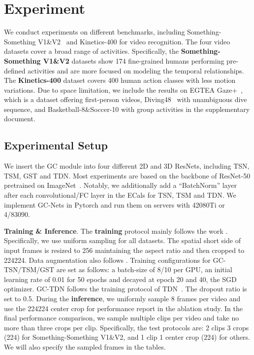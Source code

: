 \vspace{-0.2cm}
\section{Experiment}
\vspace{-0.2cm}
We conduct experiments on different benchmarks, including Something-Something V1\&V2~\cite{goyal2017something,mahdisoltani2018effectiveness} and Kinetics-400 \cite{kay2017kinetics} for video recognition. The four video datasets cover a broad range of activities. Specifically, the \textbf{Something-Something V1\&V2} datasets show 174 fine-grained humans performing pre-defined activities and are more focused on modeling the temporal relationships. The \textbf{Kinetics-400} dataset covers 400 human action classes with less motion variations. Due to space limitation, we include the results on EGTEA Gaze+~\cite{li2018eye}, which is a dataset offering first-person videos, Diving48~\cite{li2018resound} with unambiguous dive sequence, and Basketball-8\&Soccer-10 \cite{hao2020compact} with group activities in the supplementary document. 



\subsection{Experimental Setup}
\vspace{-0.1cm}
We insert the GC module into four different 2D and 3D ResNets, including TSN, TSM, GST and TDN. Most experiments are based on the backbone of ResNet-50 pretrained on ImageNet~\cite{russakovsky2015imagenet}. Notably, we additionally add a ``BatchNorm'' layer after each convolutional/FC layer in the ECals for TSN, TSM and TDN. We implement GC-Nets in Pytorch and run them on servers with 42080Ti or 4/83090.

{\bf Training \& Inference}. The \textbf{training} protocol mainly follows the work \cite{wang2016temporal}. Specifically, we use uniform sampling for all datasets. The spatial short side of input frames is resized to 256 maintaining the aspect ratio and then cropped to 224224. Data augmentation also follows \cite{wang2016temporal}. Training configurations for GC-TSN/TSM/GST are set as follows: a batch-size of 8/10 per GPU, an initial learning rate of 0.01 for 50 epochs and decayed at epoch 20 and 40, the SGD optimizer. GC-TDN follows the training protocol of TDN~\cite{wang2021tdn}. The dropout ratio is set to 0.5.  During the \textbf{inference}, we uniformly sample 8 frames per video and use the 224224 center crop for performance report in the ablation study. In the final performance comparison, we sample multiple clips per video and take no more than three crops per clip. Specifically, the test protocols are: 2 clips  3 crops (224) for Something-Something V1\&V2, and 1 clip  1 center crop (224) for others. We will also specify the sampled frames in the tables.


